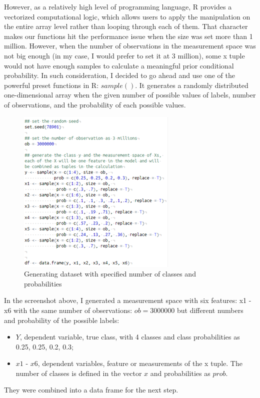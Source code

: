 \documentclass{article}
\begin{document}
\begin{multicols}{2}
        However, as a relatively high level of programming language, R provides a vectorized computational logic, which allows users to apply the manipulation on the entire array level rather than looping through each of them. That character makes our functions hit the performance issue when the size was set more than 1 million. However, when the number of observations in the measurement space was not big enough (in my case, I would prefer to set it at 3 million), some x tuple would not have enough samples to calculate a meaningful prior conditional probability. In such consideration, I decided to go ahead and use one of the powerful preset functions in R: $sample()$. It generates a randomly distributed one-dimensional array when the given number of possible values of labels, number of observations, and the probability of each possible values. 
        \begin{figure}[H]
            \centering
            \includegraphics[width=\linewidth]{fig2.png}
            \caption{Generating dataset with specified number of classes and probabilities}
        \end{figure}
        In the screenshot above, I generated a measurement space with six features: x1 - x6 with the same number of observations: $ob = 3000000$ but different numbers and probability of the possible labels:
        \begin{itemize}
            \item $Y$, dependent variable, true class, with 4 classes and class probabilities as 0.25, 0.25, 0.2, 0.3;
            \item $x1$ - $x6$, dependent variables, feature or measurements of the x tuple. The number of classes is defined in the vector $x$ and probabilities as $prob$.
        \end{itemize} 
        They were combined into a data frame for the next step.


\end{multicols}
\end{document}
